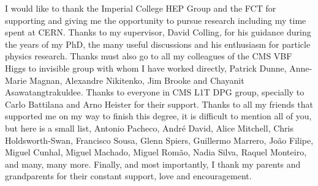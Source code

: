 
\begin{acknowledgements}
I would like to thank the Imperial College HEP Group and the FCT for supporting and giving me the opportunity to pursue research including my time spent at CERN. Thanks to my supervisor, David Colling, for his guidance during the years of my PhD, the many useful discussions and his enthusiasm for particle physics research. Thanks must also go to all my colleagues of the CMS VBF Higgs to invisible group with whom I have worked directly, Patrick Dunne, Anne-Marie Magnan, Alexandre Nikitenko, Jim Brooke and Chayanit Asawatangtrakuldee. Thanks to everyone in CMS L1T DPG group, specially to Carlo Battilana and Arno Heister for their support. Thanks to all my friends that supported me on my way to finish this degree, it is difficult to mention all of you, but here is a small list, Antonio Pacheco, André David, Alice Mitchell, Chris Holdsworth-Swan, Francisco Sousa, Glenn Spiers, Guillermo Marrero, João Filipe, Miguel Cunhal, Miguel Machado, Miguel Romão, Nadia Silva, Raquel Monteiro, and many, many more. Finally, and most importantly, I thank my parents and grandparents for their constant support, love and encouragement.
\end{acknowledgements}




\dedication{To my grandmother.}


\tableofcontents

\newpage
\listoftables

\newpage
\listoffigures


 
